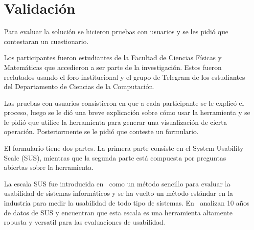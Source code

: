 \chapter{Validación}

Para evaluar la solución se hicieron pruebas con usuarios y se les pidió que contestaran un cuestionario. 

Los participantes fueron estudiantes de la Facultad de Ciencias Físicas y Matemáticas que accedieron a ser parte de la investigación. Estos fueron reclutados usando el foro institucional y el grupo de Telegram de los estudiantes del Departamento de Ciencias de la Computación.

Las pruebas con usuarios consistieron en que a cada participante se le explicó el proceso, luego se le dió una breve explicación sobre cómo usar la herramienta y se le pidió que utilice la herramienta para generar una visualización de cierta operación. Posteriormente se le pidió que conteste un formulario.

El formulario tiene dos partes. La primera parte consiste en el System Usability Scale (SUS), mientras que la segunda parte está compuesta por preguntas abiertas sobre la herramienta.

La escala SUS fue introducida en~\cite{brooke1996quick} como un método sencillo para evaluar la usabilidad de sistemas informáticos y se ha vuelto un método estándar en la industria para medir la usabilidad de todo tipo de sistemas. En~\cite{evaluation-of-sus} analizan 10 años de datos de SUS y encuentran que esta escala es una herramienta altamente robusta y versatil para las evaluaciones de usabilidad.

